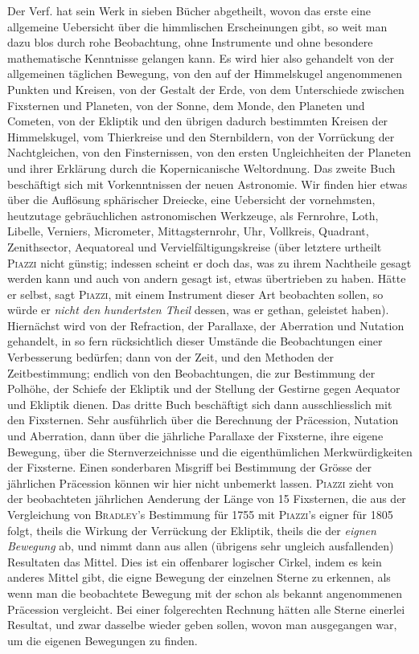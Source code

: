 Der Verf. hat sein Werk in sieben Bücher abgetheilt, wovon das erste eine allgemeine Uebersicht über die himmlischen Erscheinungen gibt, so weit man dazu blos durch rohe Beobachtung, ohne Instrumente und ohne besondere mathematische Kenntnisse gelangen kann. Es wird hier also gehandelt von der allgemeinen täglichen Bewegung, von den auf der Himmelskugel angenommenen Punkten und Kreisen, von der Gestalt der Erde, von dem Unterschiede zwischen Fixsternen und Planeten, von der Sonne, dem Monde, den Planeten und Cometen, von der Ekliptik und den übrigen dadurch bestimmten Kreisen der Himmelskugel, vom Thierkreise und den Sternbildern, von der Vorrückung der Nachtgleichen, von den Finsternissen, von den ersten Ungleichheiten der Planeten und ihrer Erklärung durch die Kopernicanische Weltordnung. Das zweite Buch beschäftigt sich mit Vorkenntnissen der neuen Astronomie. Wir finden hier etwas über die Auflösung sphärischer Dreiecke, eine Uebersicht der vornehmsten, heutzutage gebräuchlichen astronomischen Werkzeuge, als Fernrohre, Loth, Libelle, Verniers, Micrometer, Mittagsternrohr, Uhr, Vollkreis, Quadrant, Zenithsector, Aequatoreal und Vervielfältigungskreise (über letztere urtheilt \textsc{Piazzi} nicht günstig; indessen scheint er doch das, was zu ihrem Nachtheile gesagt werden kann und auch von andern gesagt ist, etwas übertrieben zu haben. Hätte er selbst, sagt \textsc{Piazzi}, mit einem Instrument dieser Art beobachten sollen, so würde er \emph{nicht den hundertsten Theil} dessen, was er gethan, geleistet haben). Hiernächst wird von der Refraction, der Parallaxe, der Aberration und Nutation gehandelt, in so fern rücksichtlich dieser Umstände die Beobachtungen einer Verbesserung bedürfen; dann von der Zeit, und den Methoden der Zeitbestimmung; endlich von den Beobachtungen, die zur Bestimmung der Polhöhe, der Schiefe der Ekliptik und der Stellung der Gestirne gegen Aequator und Ekliptik dienen. Das dritte Buch beschäftigt sich dann ausschliesslich mit den Fixsternen. Sehr ausführlich über die Berechnung der Präcession, Nutation und Aberration, dann über die jährliche Parallaxe der Fixsterne, ihre eigene Bewegung, über die Sternverzeichnisse und die eigenthümlichen Merkwürdigkeiten der Fixsterne. Einen sonderbaren Misgriff bei Bestimmung der Grösse der jährlichen Präcession können wir hier nicht unbemerkt lassen. \textsc{Piazzi} zieht von der beobachteten jährlichen Aenderung der Länge von 15 Fixsternen, die aus der Vergleichung von \textsc{Bradley}'s Bestimmung für 1755 mit \textsc{Piazzi}'s eigner für 1805 folgt, theils die Wirkung der Verrückung der Ekliptik, theils die der \emph{eignen Bewegung} ab, und nimmt dann aus allen (übrigens sehr ungleich ausfallenden) Resultaten das Mittel. Dies ist ein offenbarer logischer Cirkel, indem es kein anderes Mittel gibt, die eigne Bewegung der einzelnen Sterne zu erkennen, als wenn man die beobachtete Bewegung mit der schon als bekannt angenommenen Präcession vergleicht. Bei einer folgerechten Rechnung hätten alle Sterne einerlei Resultat, und zwar dasselbe wieder geben sollen, wovon man ausgegangen war, um die eigenen Bewegungen zu finden.

